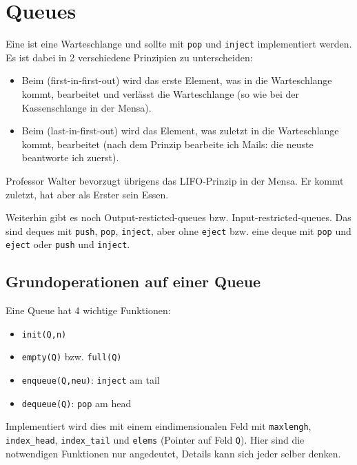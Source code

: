 \section{Queues}

Eine  ist eine Warteschlange und sollte mit \texttt{pop} und \texttt{inject} implementiert werden. Es ist dabei in 2 verschiedene Prinzipien zu unterscheiden:
\begin{itemize}
	\item Beim  (first-in-first-out) wird das erste Element, was in die Warteschlange kommt, bearbeitet und verlässt die Warteschlange (so wie bei der Kassenschlange in der Mensa).
	\item Beim  (last-in-first-out) wird das Element, was zuletzt in die Warteschlange kommt, bearbeitet (nach dem Prinzip bearbeite ich Mails: die neuste beantworte ich zuerst).
\end{itemize}

\smiley{} Professor Walter bevorzugt übrigens das LIFO-Prinzip in der Mensa. Er kommt zuletzt, hat aber als Erster sein Essen. \smiley{}

Weiterhin gibt es noch Output-resticted-queues bzw. Input-restricted-queues. Das sind deques mit \texttt{push}, \texttt{pop}, \texttt{inject}, aber ohne \texttt{eject} bzw. eine deque mit \texttt{pop} und \texttt{eject} oder \texttt{push} und \texttt{inject}.

\subsection{Grundoperationen auf einer Queue}

Eine Queue hat 4 wichtige Funktionen:
\begin{itemize}
	\item \texttt{init(Q,n)}
	\item \texttt{empty(Q)} bzw. \texttt{full(Q)}
	\item \texttt{enqueue(Q,neu)}: \texttt{inject} am tail
	\item \texttt{dequeue(Q)}: \texttt{pop} am head
\end{itemize}

Implementiert wird dies mit einem eindimensionalen Feld mit \texttt{maxlengh}, \texttt{index\_head}, \texttt{index\_tail} und \texttt{elems} (Pointer auf Feld \texttt{Q}). Hier sind die notwendigen Funktionen nur angedeutet, Details kann sich jeder selber denken.

